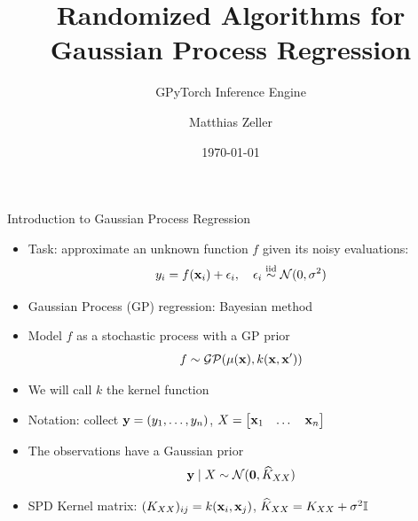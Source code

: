 \documentclass{beamer}
\title{Randomized Algorithms for\\Gaussian Process Regression}
\subtitle{GPyTorch Inference Engine}
\author{Matthias Zeller}
\date{\today}
\begin{document}
\frame{\titlepage}

\begin{frame}{Introduction to Gaussian Process Regression}
\begin{itemize}[<+->]
    \item Task: approximate an unknown function $f$ given its noisy evaluations:
    \begin{equation*}
        y_i = f(\boldsymbol{\mathbf{x}}_i) + \epsilon_i, \quad \epsilon_i \stackrel{\text{iid}}{\sim} \mathcal N(0, \sigma^2)
    \end{equation*}
    \item Gaussian Process (GP) regression: Bayesian method
    \item Model $f$ as a stochastic process with a GP prior
    \begin{equation*}
        f \sim \mathcal{GP}(\mu(\boldsymbol{\mathbf{x}}), k(\boldsymbol{\mathbf{x}}, \boldsymbol{\mathbf{x}}'))
    \end{equation*}
    \item We will call $k$ the kernel function
    \item Notation: collect $\boldsymbol{\mathbf{y}} = (y_1, \ldots, y_n)$, $X = \begin{bmatrix}
    \boldsymbol{\mathbf{x}}_1 & \dots & \boldsymbol{\mathbf{x}}_n
    \end{bmatrix}$
    \item The observations have a Gaussian prior
    \begin{equation*}
        \boldsymbol{\mathbf{y}} \mid X \sim \mathcal N(\boldsymbol{\mathbf{0}}, \widehat K_{XX})
    \end{equation*}
    \item SPD Kernel matrix: $(K_{XX})_{ij} = k(\boldsymbol{\mathbf{x}}_i, \boldsymbol{\mathbf{x}}_j)$, $\widehat K_{XX} = K_{XX} + \sigma^2 \Id$
\end{itemize}
\end{frame}
\end{document}
